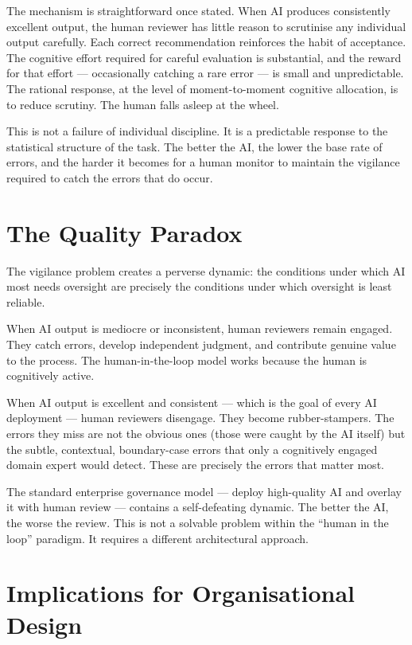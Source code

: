 The mechanism is straightforward once stated. When AI produces consistently excellent output, the human reviewer has little reason to scrutinise any individual output carefully. Each correct recommendation reinforces the habit of acceptance. The cognitive effort required for careful evaluation is substantial, and the reward for that effort --- occasionally catching a rare error --- is small and unpredictable. The rational response, at the level of moment-to-moment cognitive allocation, is to reduce scrutiny. The human falls asleep at the wheel.

This is not a failure of individual discipline. It is a predictable response to the statistical structure of the task. The better the AI, the lower the base rate of errors, and the harder it becomes for a human monitor to maintain the vigilance required to catch the errors that do occur.

\section{The Quality Paradox}

The vigilance problem creates a perverse dynamic: the conditions under which AI most needs oversight are precisely the conditions under which oversight is least reliable.

When AI output is mediocre or inconsistent, human reviewers remain engaged. They catch errors, develop independent judgment, and contribute genuine value to the process. The human-in-the-loop model works because the human is cognitively active.

When AI output is excellent and consistent --- which is the goal of every AI deployment --- human reviewers disengage. They become rubber-stampers. The errors they miss are not the obvious ones (those were caught by the AI itself) but the subtle, contextual, boundary-case errors that only a cognitively engaged domain expert would detect. These are precisely the errors that matter most.

\begin{keyinsight}
The standard enterprise governance model --- deploy high-quality AI and overlay it with human review --- contains a self-defeating dynamic. The better the AI, the worse the review. This is not a solvable problem within the ``human in the loop'' paradigm. It requires a different architectural approach.
\end{keyinsight}

\section{Implications for Organisational Design}

